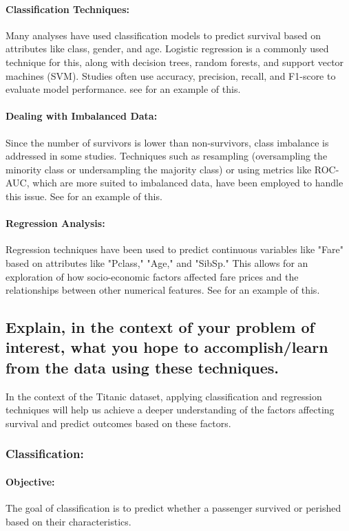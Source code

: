 \documentclass[twoside,11pt]{article}
\begin{document}
\paragraph{Classification Techniques:} Many analyses have used classification models to predict survival based on attributes like class, gender, and age. Logistic regression is a commonly used technique for this, along with decision trees, random forests, and support vector machines (SVM). Studies often use accuracy, precision, recall, and F1-score to evaluate model performance. see \cite{hackers} for an example of this.

\paragraph{Dealing with Imbalanced Data:} Since the number of survivors is lower than non-survivors, class imbalance is addressed in some studies. Techniques such as resampling (oversampling the minority class or undersampling the majority class) or using metrics like ROC-AUC, which are more suited to imbalanced data, have been employed to handle this issue. See \cite{signal} for an example of this.

\paragraph{Regression Analysis:} Regression techniques have been used to predict continuous variables like "Fare" based on attributes like "Pclass," "Age," and "SibSp." This allows for an exploration of how socio-economic factors affected fare prices and the relationships between other numerical features. See \cite{hackers} for an example of this.

\subsection*{Explain, in the context of your problem of interest, what you hope to accomplish/learn from the data using these techniques.}
In the context of the Titanic dataset, applying classification and regression techniques will help us achieve a deeper understanding of the factors affecting survival and predict outcomes based on these factors.

\subsubsection*{Classification:}

\paragraph{Objective:} The goal of classification is to predict whether a passenger survived or perished based on their characteristics.
\end{document}
